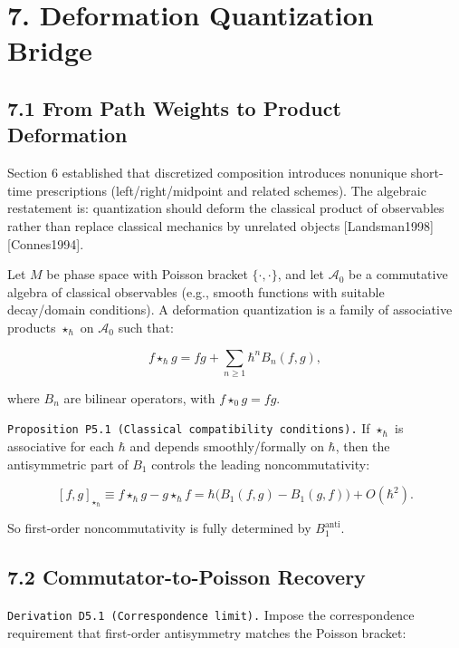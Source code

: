 \documentclass[
]{article}
\begin{document}
\hypertarget{deformation-quantization-bridge}{%
\section{7. Deformation Quantization
Bridge}\label{deformation-quantization-bridge}}

\hypertarget{from-path-weights-to-product-deformation}{%
\subsection{7.1 From Path Weights to Product
Deformation}\label{from-path-weights-to-product-deformation}}

Section 6 established that discretized composition introduces nonunique
short-time prescriptions (left/right/midpoint and related schemes). The
algebraic restatement is: quantization should deform the classical
product of observables rather than replace classical mechanics by
unrelated objects {[}Landsman1998{]} {[}Connes1994{]}.

Let \(M\) be phase space with Poisson bracket \(\{\cdot,\cdot\}\), and
let \(\mathcal A_0\) be a commutative algebra of classical observables
(e.g., smooth functions with suitable decay/domain conditions). A
deformation quantization is a family of associative products
\(\star_\hbar\) on \(\mathcal A_0\) such that:

\[
f\star_\hbar g
=
fg+\sum_{n\ge 1}\hbar^n B_n(f,g),
\]

where \(B_n\) are bilinear operators, with \(f\star_0 g=fg\).

\texttt{Proposition\ P5.1\ (Classical\ compatibility\ conditions).} If
\(\star_\hbar\) is associative for each \(\hbar\) and depends
smoothly/formally on \(\hbar\), then the antisymmetric part of \(B_1\)
controls the leading noncommutativity:

\[
[f,g]_{\star_\hbar}
\equiv
f\star_\hbar g-g\star_\hbar f
=
\hbar\big(B_1(f,g)-B_1(g,f)\big)+O(\hbar^2).
\]

So first-order noncommutativity is fully determined by
\(B_1^{\mathrm{anti}}\).

\hypertarget{commutator-to-poisson-recovery}{%
\subsection{7.2 Commutator-to-Poisson
Recovery}\label{commutator-to-poisson-recovery}}

\texttt{Derivation\ D5.1\ (Correspondence\ limit).} Impose the
correspondence requirement that first-order antisymmetry matches the
Poisson bracket:
\end{document}
